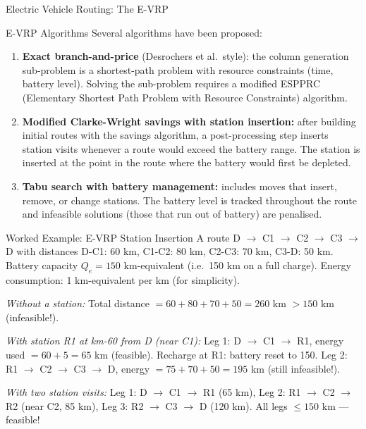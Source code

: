 \documentclass[aspectratio=169,10pt]{beamer}
\begin{document}
\begin{frame}[allowframebreaks]{Electric Vehicle Routing: The E-VRP}
  \framebreak

  \begin{block}{E-VRP Algorithms}
    Several algorithms have been proposed:
    \begin{enumerate}
      \item \textbf{Exact branch-and-price} (Desrochers et al.\ style):
      the column generation sub-problem is a shortest-path problem with
      resource constraints (time, battery level).  Solving the sub-problem
      requires a modified ESPPRC (Elementary Shortest Path Problem with
      Resource Constraints) algorithm.

      \item \textbf{Modified Clarke-Wright savings with station insertion:}
      after building initial routes with the savings algorithm, a post-processing
      step inserts station visits whenever a route would exceed the battery
      range.  The station is inserted at the point in the route where the
      battery would first be depleted.

      \item \textbf{Tabu search with battery management:}
      includes moves that insert, remove, or change stations.  The battery
      level is tracked throughout the route and infeasible solutions (those
      that run out of battery) are penalised.
    \end{enumerate}
  \end{block}

  \framebreak

  \begin{exampleblock}{Worked Example: E-VRP Station Insertion}
    A route D $\to$ C1 $\to$ C2 $\to$ C3 $\to$ D with distances
    D-C1: 60 km, C1-C2: 80 km, C2-C3: 70 km, C3-D: 50 km.
    Battery capacity $Q_e = 150$ km-equivalent (i.e.\ 150 km on a full charge).
    Energy consumption: 1 km-equivalent per km (for simplicity).

    \medskip
    \textit{Without a station:}
    Total distance $= 60+80+70+50 = 260$ km $> 150$ km (infeasible!).

    \medskip
    \textit{With station R1 at km-60 from D (near C1):}
    Leg 1: D $\to$ C1 $\to$ R1, energy used $= 60 + 5 = 65$ km (feasible).
    Recharge at R1: battery reset to 150.
    Leg 2: R1 $\to$ C2 $\to$ C3 $\to$ D, energy $= 75+70+50 = 195$ km (still infeasible!).

    \medskip
    \textit{With two station visits:}
    Leg 1: D $\to$ C1 $\to$ R1 (65 km), Leg 2: R1 $\to$ C2 $\to$ R2
    (near C2, 85 km), Leg 3: R2 $\to$ C3 $\to$ D (120 km).
    All legs $\leq 150$ km --- feasible!


\end{exampleblock}
\end{frame}
\end{document}
